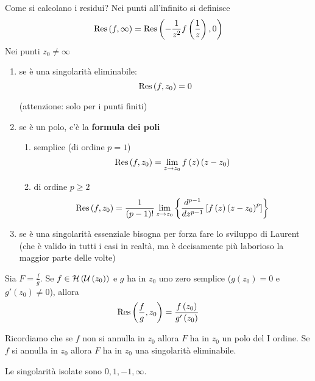 \begin{rem}
Come si calcolano i residui?
Nei punti all'infinito si definisce
\begin{equation*}
\operatorname{Res} \left(f, \infty \right) = \operatorname{Res} \left(- \frac{1}{z^{2}} f\left(\frac{1}{z}\right), 0\right)
\end{equation*}
Nei punti $z_{0} \neq \infty $
\begin{enumerate}
\item se è una singolarità eliminabile:
\begin{equation*}
\operatorname{Res} \left(f, z_{0}\right) = 0
\end{equation*}

(attenzione: solo per i punti finiti)
\item se è un polo, c'è la \textbf{formula dei poli}
\begin{enumerate}
\item semplice (di ordine $p = 1$)
\begin{equation*}
\operatorname{Res} \left(f, z_{0}\right) = \lim\limits_{z\rightarrow z_{0}} f\left(z\right)\left(z - z_{0}\right)
\end{equation*}
\item di ordine $p \geq 2$
\begin{equation*}
\operatorname{Res} \left(f, z_{0}\right) = \frac{1}{\left(p - 1\right) !}\lim\limits_{z\rightarrow z_{0}}\left\{\frac{d^{p - 1}}{dz^{p - 1}}\left[ f\left(z\right)\left(z - z_{0}\right)^{p}\right]\right\}
\end{equation*}
\end{enumerate}
\item se è una singolarità essenziale bisogna per forza fare lo sviluppo di Laurent (che è valido in tutti i casi in realtà, ma è decisamente più laborioso la maggior parte delle volte)
\end{enumerate}
\end{rem}
\begin{thm}
Sia $F = \frac{f}{g}$. Se $f\in \mathcal{H} \left(\mathcal{U} \left(z_{0}\right)\right)$ e $g$ ha in $z_{0}$ uno zero semplice ($g\left(z_{0}\right) = 0$ e $g'\left(z_{0}\right) \neq 0$), allora
\begin{equation*}
\operatorname{Res} \left(\frac{f}{g}, z_{0}\right) = \frac{f\left(z_{0}\right)}{g'\left(z_{0}\right)}
\end{equation*}

Ricordiamo che se $f$ non si annulla in $z_{0}$ allora $F$ ha in $z_{0}$ un polo del I ordine. Se $f$ si annulla in $z_{0}$ allora $F$ ha in $z_{0}$ una singolarità eliminabile.
\end{thm}
Le singolarità isolate sono $0, 1, - 1, \infty $.

